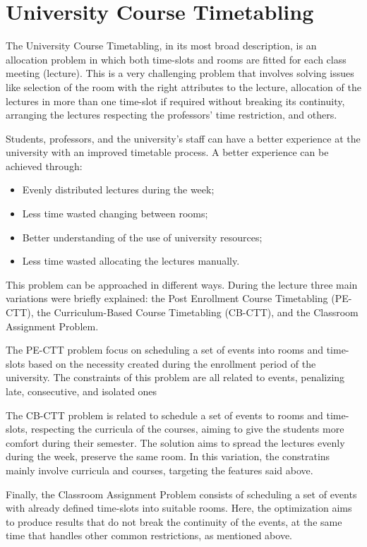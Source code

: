 \section{University Course Timetabling}

The University Course Timetabling, in its most broad description, is an allocation problem in which both time-slots and rooms are fitted for each class meeting (lecture). This is a very challenging problem that involves solving issues like selection of the room with the right attributes to the lecture, allocation of the lectures in more than one time-slot if required without breaking its continuity, arranging the lectures respecting the professors' time restriction, and others.


Students, professors, and the university's staff can have a better experience at the university with an improved timetable process. A better experience can be achieved through:
\begin{itemize}
    \item Evenly distributed lectures during the week;
    \item Less time wasted changing between rooms;
    \item Better understanding of the use of university resources;
    \item Less time wasted allocating the lectures manually.
\end{itemize}

This problem can be approached in different ways. During the lecture three main variations were briefly explained: the Post Enrollment Course Timetabling (PE-CTT), the Curriculum-Based Course Timetabling (CB-CTT), and the Classroom Assignment Problem.

The PE-CTT problem focus on scheduling a set of events into rooms and time-slots based on the necessity created during the enrollment period of the university. The constraints of this problem are all related to events, penalizing late, consecutive, and isolated ones

The CB-CTT problem is related to schedule a set of events to rooms and time-slots, respecting the curricula of the courses, aiming to give the students more comfort during their semester. The solution aims to spread the lectures evenly during the week, preserve the same room. In this variation, the constratins mainly involve curricula and courses, targeting the features said above.

Finally, the  Classroom Assignment Problem consists of scheduling a set of events with already defined time-slots into suitable rooms. Here, the optimization aims to produce results that do not break the continuity of the events, at the same time that handles other common restrictions, as mentioned above.

